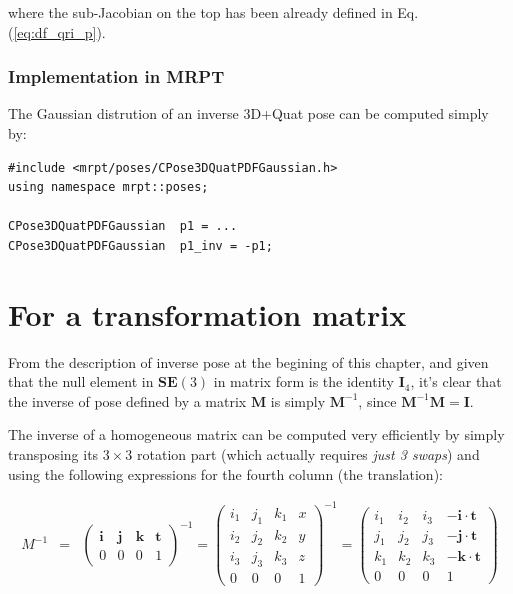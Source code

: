 \documentclass[a4paper,11pt]{report}
\begin{document}
\noindent where the sub-Jacobian on the top has been already defined in Eq.(\ref{eq:df_qri_p}).



\subsubsection{Implementation in MRPT}

The Gaussian distrution of an inverse 3D+Quat pose can be computed simply by:

\begin{lstlisting}
#include <mrpt/poses/CPose3DQuatPDFGaussian.h>
using namespace mrpt::poses;

CPose3DQuatPDFGaussian  p1 = ...
CPose3DQuatPDFGaussian  p1_inv = -p1;
\end{lstlisting}



\section{For a transformation matrix}
\label{sect:inverse:mat}

From the description of inverse pose at the begining of this chapter, and given
that the null element in $\mathbf{SE}(3)$ in matrix form is the identity $\mathbf{I}_4$,
it's clear that the inverse of pose defined by a matrix $\mathbf{M}$ is simply $\mathbf{M}^{-1}$,
since $\mathbf{M}^{-1}\mathbf{M}=\mathbf{I}$.

The inverse of a homogeneous matrix can be computed very efficiently by
simply transposing its $3 \times 3$ rotation part (which actually requires \emph{just 3 swaps})
and using the following expressions for the fourth column (the translation):

\begin{eqnarray}
M^{-1} &=&
\left(
  \begin{array}{ccc|c}
   \mathbf{i} & \mathbf{j} & \mathbf{k} & \mathbf{t} \\
\hline
   0 & 0 & 0 & 1
  \end{array}
\right) ^{-1}
=
\left(
  \begin{array}{ccc|c}
   i_1 & j_1 & k_1 & x \\
   i_2 & j_2 & k_2 & y \\
   i_3 & j_3 & k_3 & z \\
\hline
   0 & 0 & 0 & 1
  \end{array}
\right) ^{-1}
=
\left(
  \begin{array}{ccc|c}
   i_1 & i_2 & i_3   & -\mathbf{i} \cdot \mathbf{t} \\
   j_1 & j_2 & j_3   & -\mathbf{j} \cdot \mathbf{t} \\
   k_1 & k_2 & k_3   & -\mathbf{k} \cdot \mathbf{t} \\
\hline
   0 & 0 & 0 & 1
  \end{array}
\right)
\end{eqnarray}
\end{document}
